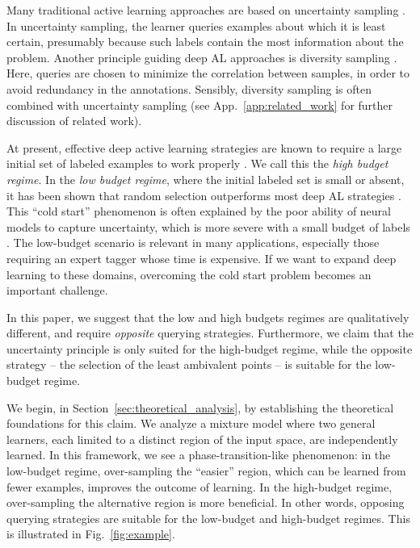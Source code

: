 \documentclass{article}
\newcommand{\app}{App.}
\begin{document}
Many traditional active learning approaches are based on uncertainty sampling \citep[e.g.,][] {lewis1994sequential,ranganathan2017deep,gissin2019discriminative,sinha2019variational}. In uncertainty sampling, the learner queries examples about which it is least certain, presumably because such labels contain the most information about the problem.
Another principle guiding deep AL approaches is diversity sampling
\citep[e.g.,][] {hu2010off,elhamifar2013convex,sener2018active,shui2020deep}.
Here, queries are chosen to minimize the correlation between samples, in order to avoid redundancy in the annotations.
Sensibly, diversity sampling is often combined with uncertainty sampling (see \app~\ref{app:related_work} for further discussion of related work).

At present, effective deep active learning strategies are known to require a large initial set of labeled examples to work properly \citep{DBLP:conf/emnlp/YuanLB20,pourahmadi2021simple}. We call this the \emph{high budget regime}. In the \emph{low budget regime}, where the initial labeled set is small or absent, it has been shown that random selection outperforms most deep AL strategies \citep[see][]{attenberg2010label,mittal2019parting,DBLP:journals/tkde/ZhuLHWGLC20,simeoni2021rethinking,chandra2021initial}. This ``cold start'' phenomenon is often explained by the poor ability of neural models to capture uncertainty, which is more severe with a small budget of labels \citep{nguyen2015deep,gal2016dropout}. The low-budget scenario is relevant in many applications, especially those requiring an expert tagger whose time is expensive. If we want to expand deep learning to these domains, overcoming the cold start problem becomes an important challenge.

In this paper, we suggest that the low and high budgets regimes are qualitatively different, and require \emph{opposite} querying strategies. Furthermore, we claim that the uncertainty principle is only suited for the high-budget regime, while the opposite strategy -- the selection of the least ambivalent points -- is suitable for the low-budget regime.


We begin, in Section~\ref{sec:theoretical_analysis}, by establishing the theoretical foundations for this claim. We analyze a mixture model where two general learners, each limited to a distinct region of the input space, are independently learned. In this framework, we see a phase-transition-like phenomenon: in the low-budget regime, over-sampling the ``easier'' region, which can be learned from fewer examples, improves the outcome of learning. In the high-budget regime, over-sampling the alternative region is more beneficial. In other words, opposing querying strategies are suitable for the low-budget and high-budget regimes. This is illustrated in Fig.~\ref{fig:example}.
\end{document}
